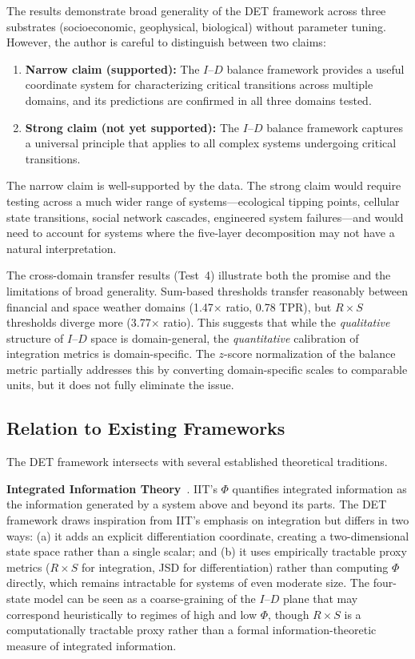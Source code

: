 \documentclass[aip,cha,reprint,amsmath,amssymb,final]{revtex4-2}
\begin{document}
The results demonstrate broad generality of the DET framework across three substrates (socioeconomic, geophysical, biological) without parameter tuning. However, the author is careful to distinguish between two claims:

\begin{enumerate}
\item \textbf{Narrow claim (supported):} The $I$--$D$ balance framework provides a useful coordinate system for characterizing critical transitions across multiple domains, and its predictions are confirmed in all three domains tested.
\item \textbf{Strong claim (not yet supported):} The $I$--$D$ balance framework captures a universal principle that applies to all complex systems undergoing critical transitions.
\end{enumerate}

The narrow claim is well-supported by the data. The strong claim would require testing across a much wider range of systems---ecological tipping points, cellular state transitions, social network cascades, engineered system failures---and would need to account for systems where the five-layer decomposition may not have a natural interpretation.

The cross-domain transfer results (Test~4) illustrate both the promise and the limitations of broad generality. Sum-based thresholds transfer reasonably between financial and space weather domains (1.47$\times$ ratio, 0.78 TPR), but $R \times S$ thresholds diverge more (3.77$\times$ ratio). This suggests that while the \emph{qualitative} structure of $I$--$D$ space is domain-general, the \emph{quantitative} calibration of integration metrics is domain-specific. The $z$-score normalization of the balance metric partially addresses this by converting domain-specific scales to comparable units, but it does not fully eliminate the issue.

\subsection{Relation to Existing Frameworks}

The DET framework intersects with several established theoretical traditions.

\textbf{Integrated Information Theory}~\cite{tononi2016}. IIT's $\Phi$ quantifies integrated information as the information generated by a system above and beyond its parts. The DET framework draws inspiration from IIT's emphasis on integration but differs in two ways: (a) it adds an explicit differentiation coordinate, creating a two-dimensional state space rather than a single scalar; and (b) it uses empirically tractable proxy metrics ($R \times S$ for integration, JSD for differentiation) rather than computing $\Phi$ directly, which remains intractable for systems of even moderate size. The four-state model can be seen as a coarse-graining of the $I$--$D$ plane that may correspond heuristically to regimes of high and low $\Phi$, though $R \times S$ is a computationally tractable proxy rather than a formal information-theoretic measure of integrated information.
\end{document}

